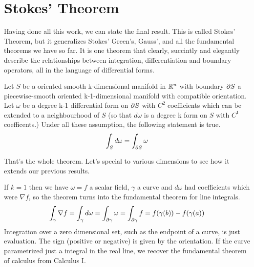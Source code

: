 \documentclass[fleqn,letterpaper]{report}
\begin{document}
\section{Stokes' Theorem}
\label{manifold-stokes}

Having done all this work, we can state the final result.
This is called Stokes' Theorem, but it generalizes Stokes'
Green's, Gauss', and all the fundamental theorems we have so
far. It is one theorem that clearly, succintly and elegantly
describe the relationships between integration,
differentiation and boundary operators, all in the language of
differential forms.

\begin{thm}
Let $S$ be a oriented smooth k-dimensional manifold in $\mathbb{R}^n$ with
boundary $\partial S$ a piecewise-smooth oriented k-1-dimensional
manifold with compatible orientation.
Let $\omega$ be a degree k-1 differential form on $\partial S$
with $C^2$ coefficients which can be extended to a
neighbourhood of $S$ (so that $d\omega$ is a degree k form on
$S$ with $C^1$ coefficents.) Under all these assumption, the
following statement is true.
\begin{equation*}
\int_S d\omega = \int_{\partial S} \omega
\end{equation*}
\end{thm}

That's the whole theorem. Let's special to various dimensions
to see how it extends our previous results. 

If $k=1$ then we have $\omega =f$ a
scalar field, $\gamma$ a curve and $d\omega$ had coefficients
which were $\nabla f$, so the theorem turns into the
fundamental theorem for line integrals.
\begin{equation*}
\int_\gamma \nabla f = \int_\gamma d \omega = \int_{\partial
\gamma} \omega = \int_{\partial \gamma} f = f(\gamma(b)) 
- f(\gamma(a))
\end{equation*}
Integration over a zero dimensional set, such as the endpoint
of a curve, is just evaluation. The sign (positive or
negative) is given by the orientation. If the curve
parametrized just a integral in the real line, we recover the
fundamental theorem of calculus from Calculus I. 
\end{document}
